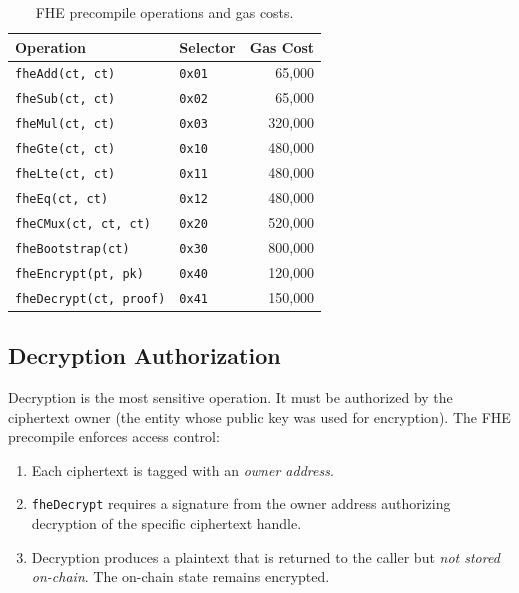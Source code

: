 \begin{table}[ht]
\centering
\caption{FHE precompile operations and gas costs.}
\label{tab:fhe-gas}
\begin{tabular}{llr}
\toprule
\textbf{Operation} & \textbf{Selector} & \textbf{Gas Cost} \\
\midrule
\texttt{fheAdd(ct, ct)} & \texttt{0x01} & 65{,}000 \\
\texttt{fheSub(ct, ct)} & \texttt{0x02} & 65{,}000 \\
\texttt{fheMul(ct, ct)} & \texttt{0x03} & 320{,}000 \\
\texttt{fheGte(ct, ct)} & \texttt{0x10} & 480{,}000 \\
\texttt{fheLte(ct, ct)} & \texttt{0x11} & 480{,}000 \\
\texttt{fheEq(ct, ct)} & \texttt{0x12} & 480{,}000 \\
\texttt{fheCMux(ct, ct, ct)} & \texttt{0x20} & 520{,}000 \\
\texttt{fheBootstrap(ct)} & \texttt{0x30} & 800{,}000 \\
\texttt{fheEncrypt(pt, pk)} & \texttt{0x40} & 120{,}000 \\
\texttt{fheDecrypt(ct, proof)} & \texttt{0x41} & 150{,}000 \\
\bottomrule
\end{tabular}
\end{table}

\subsection{Decryption Authorization}

Decryption is the most sensitive operation. It must be authorized by the ciphertext
owner (the entity whose public key was used for encryption). The FHE precompile
enforces access control:

\begin{enumerate}[leftmargin=2em]
  \item Each ciphertext is tagged with an \emph{owner address}.
  \item \texttt{fheDecrypt} requires a signature from the owner address authorizing
        decryption of the specific ciphertext handle.
  \item Decryption produces a plaintext that is returned to the caller but
        \emph{not stored on-chain}. The on-chain state remains encrypted.
\end{enumerate}

